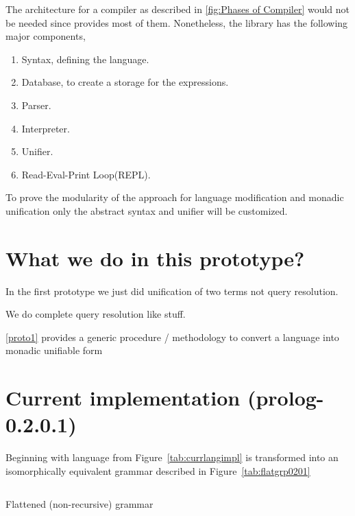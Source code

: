 \documentclass[thesis-solanki.tex]{subfiles}
\begin{document}
The architecture for a compiler as described in \ref{fig:Phases of Compiler} would not be needed since  provides most of
them. Nonetheless, the library has the following major components,

\begin{enumerate}
\item Syntax, defining the language.

\item Database, to create a storage for the expressions.

\item Parser.

\item Interpreter.

\item Unifier.

\item Read-Eval-Print Loop(REPL). 
\end{enumerate}

To prove the modularity of the approach for language modification and monadic unification only the abstract syntax and unifier will be
customized.


\clearpage
\section{What we do in this prototype?}
In the first prototype we just did unification of two terms not query resolution.

We do complete  query resolution like stuff.

\ref{proto1} provides a generic procedure / methodology to convert a language into monadic unifiable form

\clearpage
\section{Current implementation (prolog-0.2.0.1)}

Beginning with language from Figure~\ref{tab:currlangimpl} is transformed into an isomorphically equivalent grammar described in 
Figure~\ref{tab:flatgrp0201}

\begin{code-list}[h]
  \begin{singlespace}
    \inputminted[linenos]{haskell}{haskell-proto2-flattened-rarefy.hs}
  \end{singlespace}
  \caption{Flattened (non-recursive) grammar}
\label{tab:flatgrp0201}
\end{code-list}
\end{document}
